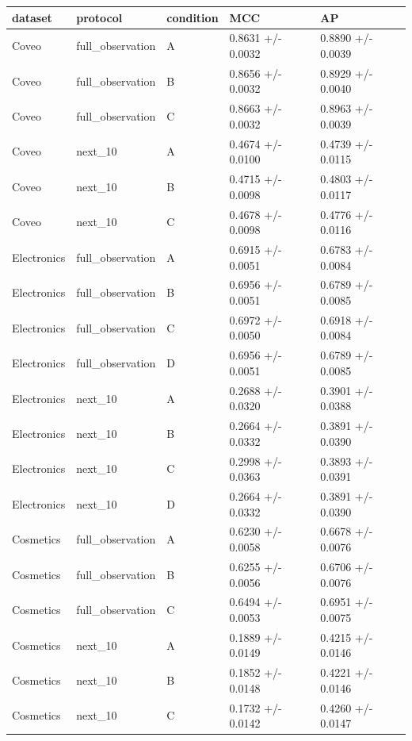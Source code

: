 \begin{tabular}{lllll}
\toprule
dataset & protocol & condition & MCC & AP \\
\midrule
Coveo & full\_observation & A & 0.8631 +/- 0.0032 & 0.8890 +/- 0.0039 \\
Coveo & full\_observation & B & 0.8656 +/- 0.0032 & 0.8929 +/- 0.0040 \\
Coveo & full\_observation & C & 0.8663 +/- 0.0032 & 0.8963 +/- 0.0039 \\
Coveo & next\_10 & A & 0.4674 +/- 0.0100 & 0.4739 +/- 0.0115 \\
Coveo & next\_10 & B & 0.4715 +/- 0.0098 & 0.4803 +/- 0.0117 \\
Coveo & next\_10 & C & 0.4678 +/- 0.0098 & 0.4776 +/- 0.0116 \\
Electronics & full\_observation & A & 0.6915 +/- 0.0051 & 0.6783 +/- 0.0084 \\
Electronics & full\_observation & B & 0.6956 +/- 0.0051 & 0.6789 +/- 0.0085 \\
Electronics & full\_observation & C & 0.6972 +/- 0.0050 & 0.6918 +/- 0.0084 \\
Electronics & full\_observation & D & 0.6956 +/- 0.0051 & 0.6789 +/- 0.0085 \\
Electronics & next\_10 & A & 0.2688 +/- 0.0320 & 0.3901 +/- 0.0388 \\
Electronics & next\_10 & B & 0.2664 +/- 0.0332 & 0.3891 +/- 0.0390 \\
Electronics & next\_10 & C & 0.2998 +/- 0.0363 & 0.3893 +/- 0.0391 \\
Electronics & next\_10 & D & 0.2664 +/- 0.0332 & 0.3891 +/- 0.0390 \\
Cosmetics & full\_observation & A & 0.6230 +/- 0.0058 & 0.6678 +/- 0.0076 \\
Cosmetics & full\_observation & B & 0.6255 +/- 0.0056 & 0.6706 +/- 0.0076 \\
Cosmetics & full\_observation & C & 0.6494 +/- 0.0053 & 0.6951 +/- 0.0075 \\
Cosmetics & next\_10 & A & 0.1889 +/- 0.0149 & 0.4215 +/- 0.0146 \\
Cosmetics & next\_10 & B & 0.1852 +/- 0.0148 & 0.4221 +/- 0.0146 \\
Cosmetics & next\_10 & C & 0.1732 +/- 0.0142 & 0.4260 +/- 0.0147 \\
\bottomrule
\end{tabular}
